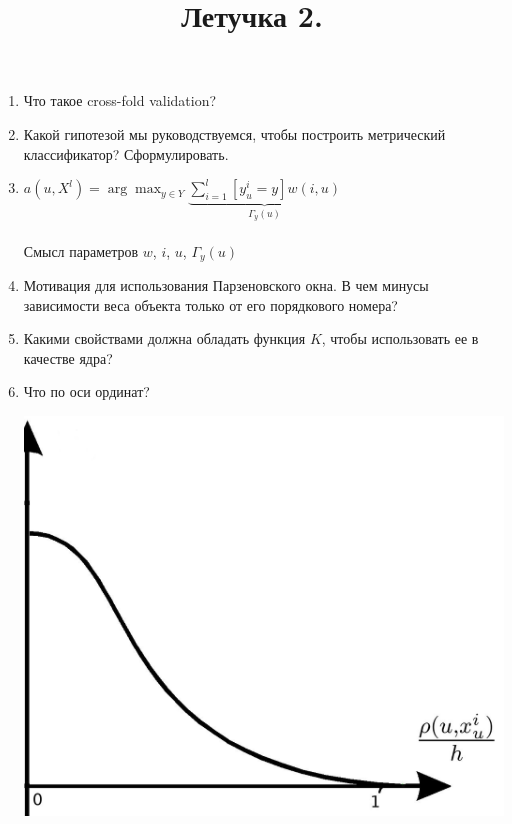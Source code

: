 \documentclass[12pt] {article}
\title{Летучка 2.}
\begin{document}
\clearpage
\thispagestyle{empty}
\begin{enumerate}
\item Что такое cross-fold validation? 
\vspace{10mm}
\item Какой гипотезой мы руководствуемся, чтобы построить метрический классификатор? Сформулировать.
\vspace{10mm}
\item ${a(u, X^l) = \arg\max_{y \in Y} \underbrace{\sum\limits_{i=1}^l [y_u^i = y]w(i, u)}_{\Gamma_y(u)} }$\\
\\ Смысл параметров $w$, $i$, $u$, $\Gamma_y(u)$
\vspace{10mm}
\item Мотивация для использования Парзеновского окна. В чем минусы зависимости веса объекта только от его порядкового номера?
\vspace{10mm}
\item Какими свойствами должна обладать функция $K$, чтобы использовать ее в качестве ядра?
\vspace{10mm}
\item 
\begin{minipage}[t]{0.65\linewidth}
      Что по оси ординат? 
   \end{minipage}%
   \hfill
   \begin{minipage}[t]{0.35\linewidth}
     \vspace{-9.5ex}
	\includegraphics[width=.9\textwidth]{parzen}
   \end{minipage}
   

\end{enumerate}
\end{document}
